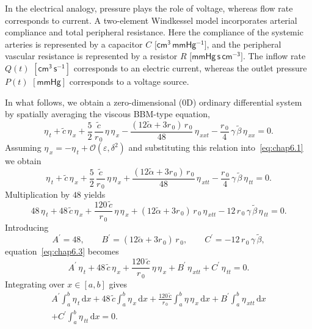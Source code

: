 \documentclass[alpha-refs, 12pt]{wiley-article}
\renewcommand{\O}{\mathcal{O}}
\newcommand{\ud}{\mathrm{d}}
\newcommand{\eps}{\varepsilon}
\begin{document}
In the electrical analogy, pressure plays the role of voltage, whereas flow rate corresponds to current. A two-element Windkessel model incorporates arterial compliance and total peripheral resistance. Here the compliance of the systemic arteries is represented by a capacitor \(\!C\) \(\bigl[\mathsf{cm^{3}\,mmHg^{-1}}\bigr]\), and the peripheral vascular resistance is represented by a resistor \(R\) \(\bigl[\mathsf{mmHg\,s\,cm^{-3}}\bigr]\). The inflow rate \(Q(t)\) \([\mathsf{cm^{3}\,s^{-1}}]\) corresponds to an electric current, whereas the outlet pressure \(P(t)\) \([\mathsf{mmHg}]\) corresponds to a voltage source.

In what follows, we obtain a zero-dimensional (0D) ordinary differential system by spatially averaging the viscous BBM-type equation,
\begin{equation}\label{eq:chap6.1}
  \eta_{\,t}
  +\tilde{c}\,\eta_{\,x}
  +\frac{5}{2}\,\frac{\tilde{c}}{r_{\,0}}\,\eta\,\eta_{\,x}
  -\frac{(12\tilde{\alpha}+3r_{\,0})\,r_{\,0}}{48}\,\eta_{\,xxt}
  -\frac{r_{\,0}}{4}\,\gamma\,\tilde{\beta}\,\eta_{\,xx}=0.
\end{equation}
Assuming
\(\eta_{\,x}=-\eta_{\,t} + \O(\eps,\delta^{2})\) and substituting this
relation into~\eqref{eq:chap6.1} we obtain
\begin{equation}\label{eq:chap6.2}
  \eta_{\,t}
  +\tilde{c}\,\eta_{\,x}
  +\frac{5}{2}\,\frac{\tilde{c}}{r_{\,0}}\,\eta\,\eta_{\,x}
  +\frac{(12\tilde{\alpha}+3r_{\,0})\,r_{\,0}}{48}\,\eta_{\,xtt}
  -\frac{r_{\,0}}{4}\,\gamma\,\tilde{\beta}\,\eta_{\,tt}=0.
\end{equation}
Multiplication by \(48\) yields
\begin{equation}\label{eq:chap6.3}
  48\,\eta_{\,t}
  +48\,\tilde{c}\,\eta_{\,x}
  +\frac{120\,\tilde{c}}{r_{\,0}}\,\eta\,\eta_{\,x}
  +(12\tilde{\alpha}+3r_{\,0})\,r_{\,0}\,\eta_{\,xtt}
  -12\,r_{\,0}\,\gamma\,\tilde{\beta}\,\eta_{\,tt}=0.
\end{equation}
Introducing
\[
  A^{\prime}=48,\qquad
  B^{\prime}=(12\tilde{\alpha}+3r_{\,0})\,r_{\,0},\qquad
  C^{\prime}=-12\,r_{\,0}\,\gamma\,\tilde{\beta},
\]
equation~\eqref{eq:chap6.3} becomes
\begin{equation}
  A^{\prime}\,\eta_{\,t}
  +48\,\tilde{c}\,\eta_{\,x}
  +\frac{120\,\tilde{c}}{r_{\,0}}\,\eta\,\eta_{\,x}
  +B^{\prime}\,\eta_{\,xtt}
  +C^{\prime}\,\eta_{\,tt}=0.
\end{equation}
Integrating over \(x\in[a,b]\) gives
\begin{multline}\label{eq:chap6.4}
  A^{\prime}\int_{a}^{b}\eta_{\,t}\,\ud x
  +48\,\tilde{c}\int_{a}^{b}\eta_{\,x}\,\ud x
  +\frac{120\,\tilde{c}}{r_{\,0}}\int_{a}^{b}\eta\,\eta_{\,x}\,\ud x
  +B^{\prime}\int_{a}^{b}\eta_{\,xtt}\,\ud x\\
  +C^{\prime}\int_{a}^{b}\eta_{\,tt}\,\ud x=0.
\end{multline}
\end{document}
